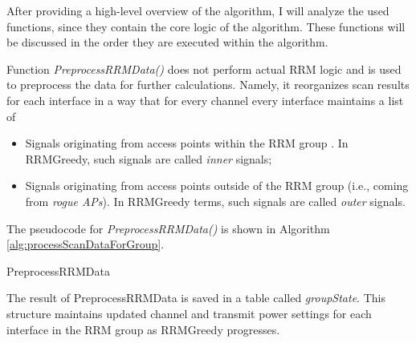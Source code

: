 After providing a high-level overview of the algorithm, I will analyze the used functions, since they contain the core logic of the algorithm. These functions will be discussed in the order they are executed within the algorithm.

Function \textit{PreprocessRRMData()} does not perform actual RRM logic and is used to preprocess the data for further calculations. Namely, it reorganizes scan results for each interface in a way that for every channel every interface maintains a list of
\begin{itemize}
    \item Signals originating from access points within the RRM group \rrmG. In RRMGreedy, such signals are called \textit{inner} signals;
    \item Signals originating from access points outside of the RRM group (i.e., coming from \textit{rogue APs}). In RRMGreedy terms, such signals are called \textit{outer} signals.
\end{itemize}
The pseudocode for \textit{PreprocessRRMData()} is shown in Algorithm \ref{alg:processScanDataForGroup}.

\begin{algorithm}[H]
\label{alg:processScanDataForGroup}
\caption{PreprocessRRMData}
\DontPrintSemicolon

\end{algorithm}
The result of PreprocessRRMData is saved in a table called \textit{groupState}. This structure maintains updated channel and transmit power settings for each interface in the RRM group as RRMGreedy progresses.


